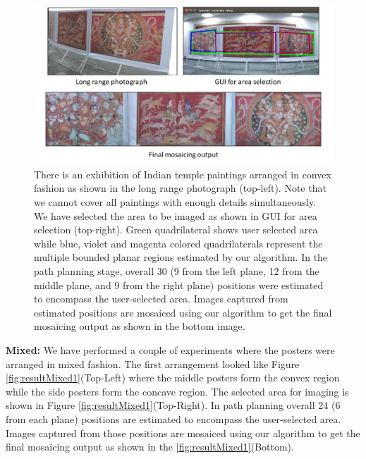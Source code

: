 \begin{figure}[t!]
\centering
\includegraphics[width=\linewidth]{figures/multiplanar/convexResult.pdf}
\caption[Result: Convex arrangement]{There is an exhibition of Indian temple
paintings arranged in convex fashion as shown in the long range photograph (top-left). Note that we
cannot cover all paintings with enough details simultaneously. We have selected
the area to be imaged as shown in GUI for area selection (top-right).
Green quadrilateral shows user selected area while blue, violet and magenta
colored quadrilaterals represent the multiple bounded planar regions
estimated by our algorithm. In the path planning stage, overall 30 (9 from
the left plane, 12 from the middle plane, and 9 from the right plane) positions were
estimated to encompass the user-selected area. Images captured from estimated
positions are mosaiced using our algorithm to get the final mosaicing output as shown in
the bottom image.}
\label{fig:resultConvex}
\end{figure}

\textbf{Mixed:} We have performed a couple of experiments where the posters were
arranged in mixed fashion. The first arrangement looked like Figure
\ref{fig:resultMixed1}(Top-Left) where the middle posters form the convex region
while the side posters form the concave region. The selected area for imaging is
shown in Figure \ref{fig:resultMixed1}(Top-Right). In path planning overall 24 (6 from each
plane) positions are estimated to encompass the user-selected area. Images
captured from those positions are mosaiced using our algorithm to get the final mosaicing
output as shown in the \ref{fig:resultMixed1}(Bottom).

